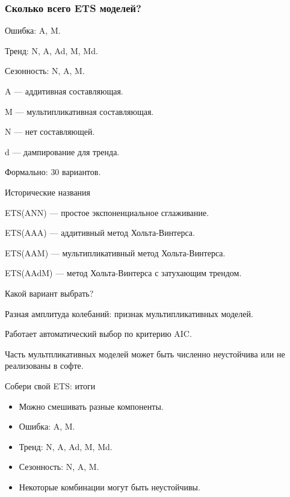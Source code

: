 \begin{frame}
  \frametitle{Сколько всего ETS моделей?}

  
  \alert{Ошибка}: A, M.
  
  \alert{Тренд}: N, A, Ad, M, Md. 
  
  \alert{Сезонность}: N, A, M.

  \pause
  A — \alert{аддитивная} составляющая. 

  M — \alert{мультипликативная} составляющая. 

  N — нет составляющей. 

  d — \alert{дампирование} для тренда. 

  \pause

  Формально: \alert{30 вариантов}. 

\end{frame}


\begin{frame}{Исторические названия}

  ETS(ANN) — простое экспоненциальное сглаживание.

  ETS(AAA) — аддитивный метод Хольта-Винтерса.

  ETS(AAM) — мультипликативный метод Хольта-Винтерса.

  ETS(AAdM) — метод Хольта-Винтерса с затухающим трендом.
  
\end{frame}


\begin{frame}{Какой вариант выбрать?}

  \alert{Разная амплитуда} колебаний: признак мультипликативных моделей.

  \pause

  Работает автоматический выбор по критерию \alert{AIC}.

  \pause

  Часть мультпликативных моделей может быть \alert{численно неустойчива} 
  или \alert{не реализованы} в софте. 

\end{frame}


\begin{frame}{Собери свой ETS: итоги}

  \begin{itemize}[<+->]
    \item Можно смешивать разные компоненты. 
    \item \alert{Ошибка}: A, M.
    \item \alert{Тренд}: N, A, Ad, M, Md. 
    \item \alert{Сезонность}: N, A, M.
    \item Некоторые комбинации могут быть \alert{неустойчивы}. 

  \end{itemize}
\end{frame}



